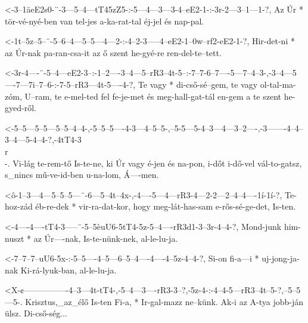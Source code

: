   {<-3--1äeE2s0-¨-3---5--4---tT45zZ5-:-5---4---3---3-4--eE2-1-:-3r-2---3--1---1-?,}
  {  Az Úr      * tör-vé-nyé-ben       van tel-jes a-ka-rat-tal éj-jel és nap-pal.}

  {<-1t--5z--5--¨-5--6--4---5--5---4---2-:-4--2-3-----4--eE2-1--0w--rf2-eE2-1-?,}
  {  Hir-det-ni * az Úr-nak pa-ran-csa-it  az ő szent he-gyé-re ren-del-te--tett.}

  {<-3r-4----¨-5--4---eE2-3--:-1--2----3--4---5--rR3--4t-5--:-7--7-6--7----5---7--4--3-,-3--4---5----7---7i--7--6-:-7-5--rR3---4t-5----4-?,}
  {  Te vagy * di-cső-sé--gem, te vagy ol-tal-ma-zóm, U--ram, te e-mel-ted fel fe-je-met és meg-hall-gat-tál en-gem a te szent he-gyed-ről.}


  {<-5--5---5--5---5--5--4--4-,-5--5--5----4-3---4--5--5-,--5-5---5-4--3---4---3--2----,-3-------4--4--3--4---5-4--4-?,-4tT4-3\\r\\-.}
  {  Vi-lág te-rem-tő Is-te-ne, ki Úr vagy é-jen és na-pon, i-dőt i-dő-vel vál-to-gatsz, s_nincs mű-ve-id-ben u-na-lom, Á----men.}

  {<ô-1--3---4---5--5--5---¨-6---5--4t--4x-,-4----5---4---rR3-4---2-2---2--4--4----1í-1í-?,}
  {   Te-hoz-zád éb-re-dek * vir-ra-dat-kor, hogy meg-lát-has-sam e-rős-sé-ge-det, Is-ten.}

  {<-4----4----tT4-3-----¨-5--5èuU6-5tT4-5z-5--4----rR3d1-3--3r-4--4-?,}
  {  Mond-junk him-nuszt * az Úr----nak, Is-te-nünk-nek,  al-le-lu-ja.}

  {<-7--7--7--uU6-5x-:-5--5----4--5---6--5--4----4----4--5z-4--4-?,}
  {  Si-on fi-a---i  * uj-jong-ja-nak Ki-rá-lyuk-ban, al-le-lu-ja.}

  {<X-¢----------------4--3---4t-tT4-,-5--4---3----rR3-3--?,-5z-4-:-4--4-5---rR3--4t--5-?,--5--5---5-.}
  {   Krisztus,_az_élő Is-ten Fi-a,  * Ir-gal-mazz ne--künk. Ak-i   az A-tya jobb-ján ülsz. Di-cső-ség...}


